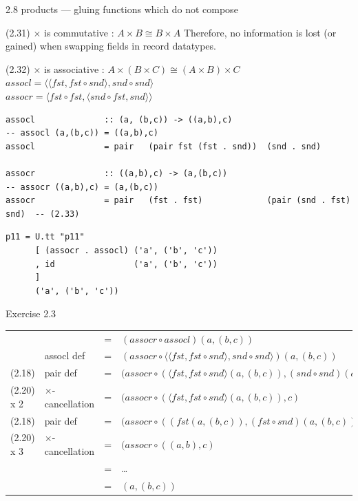 \documentclass[presentation]{beamer}
\begin{document}
\begin{frame}[fragile,label=sec-7]{2.8 products --- gluing functions which do not compose}
\begin{block}{(2.31) $\times$ is commutative : $A \times B \cong B \times A$}
Therefore, no information is lost (or gained) when swapping fields in record datatypes.
\end{block}

\begin{block}{(2.32) $\times$ is associative : $A \times (B \times C) \cong (A \times B) \times C$}
$assocl = \langle \langle fst, fst \circ snd \rangle, snd \circ snd \rangle$ \\
$assocr = \langle fst \circ fst, \langle snd \circ fst, snd \rangle \rangle$

\begin{verbatim}
assocl              :: (a, (b,c)) -> ((a,b),c)
-- assocl (a,(b,c)) = ((a,b),c)
assocl              = pair   (pair fst (fst . snd))  (snd . snd)

assocr              :: ((a,b),c) -> (a,(b,c))
-- assocr ((a,b),c) = (a,(b,c))
assocr              = pair   (fst . fst)             (pair (snd . fst) snd)  -- (2.33)
\end{verbatim}

\begin{verbatim}
p11 = U.tt "p11"
      [ (assocr . assocl) ('a', ('b', 'c'))
      , id                ('a', ('b', 'c'))
      ]
      ('a', ('b', 'c'))
\end{verbatim}

\alert{Exercise 2.3}

\begin{center}
\begin{tabular}{llll}
 &  & = & $(assocr \circ assocl) (a, (b, c))$\\
 & assocl def & = & $(assocr \circ \langle \langle fst      ,  fst \circ snd \rangle            ,  snd \circ snd \rangle) (a, (b, c))$\\
(2.18) & pair def & = & $(assocr \circ (       \langle fst      ,  fst \circ snd \rangle (a, (b, c)), (snd \circ snd) (a, (b, c))   )$\\
(2.20) x 2 & $\times$-cancellation & = & $(assocr \circ (       \langle fst      ,  fst \circ snd \rangle (a, (b, c)),                         c     )$\\
(2.18) & pair def & = & $(assocr \circ (        (fst (a, (b, c)), (fst \circ snd) (a, (b, c)) ),                              c     )$\\
(2.20) x 3 & $\times$-cancellation & = & $(assocr \circ (        (     a         ,                      b      ),                              c     )$\\
 &  & = & \ldots{}\\
 &  & = & $(a, (b, c))$\\
\end{tabular}
\end{center}


\end{block}
\end{frame}
\end{document}
